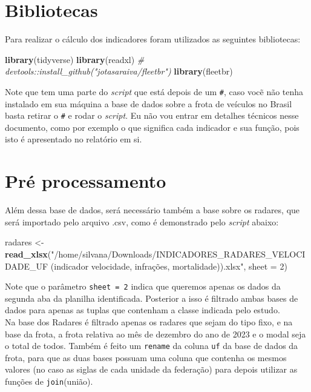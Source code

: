 \documentclass[
]{book}
\newenvironment{Shaded}{\begin{snugshade}}{\end{snugshade}}
\newcommand{\AttributeTok}[1]{\textcolor[rgb]{0.13,0.29,0.53}{#1}}
\newcommand{\CommentTok}[1]{\textcolor[rgb]{0.56,0.35,0.01}{\textit{#1}}}
\newcommand{\DecValTok}[1]{\textcolor[rgb]{0.00,0.00,0.81}{#1}}
\newcommand{\FunctionTok}[1]{\textcolor[rgb]{0.13,0.29,0.53}{\textbf{#1}}}
\newcommand{\NormalTok}[1]{#1}
\newcommand{\OtherTok}[1]{\textcolor[rgb]{0.56,0.35,0.01}{#1}}
\newcommand{\StringTok}[1]{\textcolor[rgb]{0.31,0.60,0.02}{#1}}
\begin{document}
\section{Bibliotecas}\label{bibliotecas}

Para realizar o cálculo dos indicadores foram utilizados as seguintes bibliotecas:

\begin{Shaded}
\begin{Highlighting}[]
\FunctionTok{library}\NormalTok{(tidyverse)}
\FunctionTok{library}\NormalTok{(readxl)}
\CommentTok{\# devtools::install\_github("jotasaraiva/fleetbr")}
\FunctionTok{library}\NormalTok{(fleetbr)}
\end{Highlighting}
\end{Shaded}

Note que tem uma parte do \emph{script} que está depois de um \texttt{\#}, caso vocẽ não tenha instalado em sua máquina a base de dados sobre a frota de veículos no Brasil basta retirar o \texttt{\#} e rodar o \emph{script}. Eu não vou entrar em detalhes técnicos nesse documento, como por exemplo o que significa cada indicador e sua função, pois isto é apresentado no relatório em si.

\section{Pré processamento}\label{pruxe9-processamento}

Além dessa base de dados, será necessário também a base sobre os radares, que será importado pelo arquivo .csv, como é demonstrado pelo \emph{script} abaixo:

\begin{Shaded}
\begin{Highlighting}[]
\NormalTok{radares }\OtherTok{\textless{}{-}} \FunctionTok{read\_xlsx}\NormalTok{(}\StringTok{"/home/silvana/Downloads/INDICADORES\_RADARES\_VELOCIDADE\_UF (indicador velocidade, infrações, mortalidade)).xlsx"}\NormalTok{, }\AttributeTok{sheet =} \DecValTok{2}\NormalTok{)}
\end{Highlighting}
\end{Shaded}

Note que o parâmetro \texttt{sheet\ =\ 2} indica que queremos apenas os dados da segunda aba da planilha identificada. Posterior a isso é filtrado ambas bases de dados para apenas as tuplas que contenham a classe indicada pelo estudo.\\
Na base dos Radares é filtrado apenas os radares que sejam do tipo fixo, e na base da frota, a frota relativa ao mês de dezembro do ano de 2023 e o modal seja o total de todos. Também é feito um \texttt{rename} da coluna \texttt{uf} da base de dados da frota, para que as duas bases possuam uma coluna que contenha os mesmos valores (no caso as siglas de cada unidade da federação) para depois utilizar as funções de \texttt{join}(união).
\end{document}
